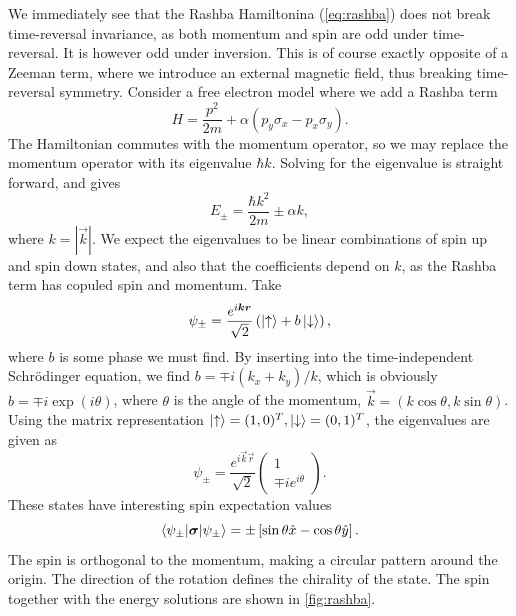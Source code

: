 We immediately see that the Rashba Hamiltonina (\ref{eq:rashba}) does not break time-reversal invariance, as both momentum and spin are odd under time-reversal.
It is however odd under inversion.
This is of course exactly opposite of a Zeeman term, where we introduce an external magnetic field, thus breaking time-reversal symmetry.
Consider a free electron model where we add a Rashba term
\begin{equation}
  H = \frac{p^2}{2m} + \alpha (p_y \sigma _x - p_x \sigma _y).
\end{equation}
The Hamiltonian commutes with the momentum operator, so we may replace the momentum operator with its eigenvalue $\hbar k$.
Solving for the eigenvalue is straight forward, and gives
\begin{equation}
  E_{\pm} = \frac{\hbar k^2}{2m} \pm \alpha k,
\end{equation}
where $k=|\vec{k}|$.
We expect the eigenvalues to be linear combinations of spin up and spin down states, and also that the coefficients depend on $k$, as the Rashba term has copuled spin and momentum.
Take
\begin{equation}
  \psi_{\pm} = \frac{e^{i \bm{k} \bm{r}}}{\sqrt{2}} \left( \ket{\uparrow} + b \ket{\downarrow} \right),
\end{equation}
where $b$ is some phase we must find.
By inserting into the time-independent Schrödinger equation, we find $b = \mp i (k_x + k_y ) /k$, which is obviously $b=\mp i \exp (i \theta )$, where $\theta $ is the angle of the momentum, $\vec{k} = (k \cos \theta , k \sin \theta)$.
Using the matrix representation $\ket{\uparrow} = (1,0)^T, \ket{\downarrow} = (0,1)^T$, the eigenvalues are given as
\begin{equation}
  \psi _{\pm} =
  \frac{e^{i \vec{k} \vec{r}}}{\sqrt{2}}
  \begin{pmatrix}
    1\\
    \mp i e^{i \theta }
  \end{pmatrix}.
\end{equation}
These states have interesting spin expectation values
\begin{equation}
  \braket{\psi_{\pm} | \bm{\sigma} | \psi _{\pm}}
  =
  \pm
  \left[  
    \sin\theta \hat{x} - \cos \theta \hat{y}
  \right].
\end{equation}
The spin is orthogonal to the momentum, making a circular pattern around the origin.
The direction of the rotation defines the chirality of the state.
The spin together with the energy solutions are shown in \cref{fig:rashba}.


